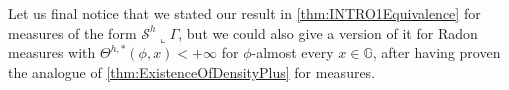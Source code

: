 \documentclass[10pt, a4paper,
oneside, headinclude,footinclude]{scrartcl}
\begin{document}
Let us final notice that we stated our result in \cref{thm:INTRO1Equivalence} for measures of the form $\mathcal{S}^h\llcorner \Gamma$, but we could also give a version of it for Radon measures with $\Theta^{h,*}(\phi,x)<+\infty$ for $\phi$-almost every $x\in\mathbb G$, after having proven the analogue of \cref{thm:ExistenceOfDensityPlus} for measures. %

%
\end{document}
